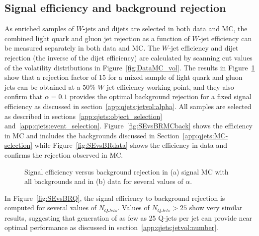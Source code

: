 \subsection{Signal efficiency and background rejection}
\label{app:qjets:jetvol:rejection}

As enriched samples of $W$-jets and dijets are selected in both data and MC, the combined light quark and gluon jet rejection as a function of $W$-jet efficiency can be measured separately in both data and MC. The $W$-jet efficiency and dijet rejection (the inverse of the dijet efficiency) are calculated by scanning cut values of the volatility distributions in Figure~\ref{fig:DataMC_vol}. The results in Figure~\ref{fig:SEvsBR} show that a rejection factor of 15 for a mixed sample of light quark and gluon jets can be obtained at a $50\%$ $W$-jet efficiency working point, and they also confirm that $\alpha = 0.1$ provides the optimal background rejection for a fixed signal efficiency as discussed in section~\ref{app:qjets:jetvol:alpha}. All samples are selected as described in sections~\ref{app:qjets:object_selection} and~\ref{app:qjets:event_selection}. Figure~\ref{fig:SEvsBRMCback} shows the efficiency in MC and includes the backgrounds discussed in Section~\ref{app:qjets:MC-selection} while Figure~\ref{fig:SEvsBRdata} shows the efficiency in data and confirms the rejection observed in MC.

\begin{figure}[htbp]
\centering
\caption{Signal efficiency versus background rejection in (a) signal MC with all backgrounds and in (b) data for several values of $\alpha$.}%
\label{fig:SEvsBR}
\end{figure}

In Figure~\ref{fig:SEvsBRQ}, the signal efficiency to background rejection is computed for several values of $N_{QJets}$. Values of $N_{QJets} > 25$ show very similar results, suggesting that generation of as few as 25 Q-jets per jet can provide near optimal performance as discussed in section~\ref{app:qjets:jetvol:number}.

